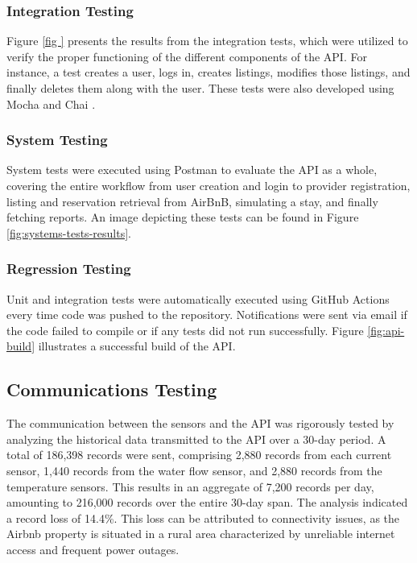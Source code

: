 \subsubsection{Integration Testing}

Figure \ref{fig
} presents the results from the integration tests, which were utilized to verify the proper functioning of the different 
components of the API. For instance, a test creates a user, logs in, creates listings, modifies those listings, and 
finally deletes them along with the user. These tests were also developed using Mocha \cite{Mocha2024} and Chai 
\cite{Chai2024}.

\subsubsection{System Testing}

System tests were executed using Postman \cite{Postman2024} to evaluate the API as a whole, covering the entire workflow 
from user creation and login to provider registration, listing and reservation retrieval from AirBnB, simulating a stay, 
and finally fetching reports. An image depicting these tests can be found in Figure \ref{fig:systems-tests-results}.

\subsubsection{Regression Testing}

Unit and integration tests were automatically executed using GitHub Actions every time code was pushed to the 
repository. Notifications were sent via email if the code failed to compile or if any tests did not run successfully. 
Figure \ref{fig:api-build} illustrates a successful build of the API.

\subsection{Communications Testing}

The communication between the sensors and the API was rigorously tested by analyzing the historical data transmitted to 
the API over a 30-day period. A total of 186,398 records were sent, comprising 2,880 records from each current sensor, 
1,440 records from the water flow sensor, and 2,880 records from the temperature sensors. This results in an aggregate 
of 7,200 records per day, amounting to 216,000 records over the entire 30-day span. The analysis indicated a record loss 
of 14.4\%. This loss can be attributed to connectivity issues, as the Airbnb property is situated in a rural area 
characterized by unreliable internet access and frequent power outages.

